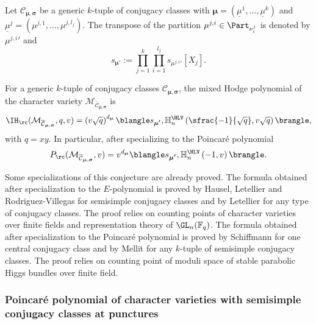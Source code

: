 Let $\mathcal{C}_{\boldsymbol{\mu},\boldsymbol{\sigma}}$ be a generic $k$-tuple of conjugacy classes with $\boldsymbol{\mu}=(\underline{\mu}^1,\dots,\underline{\mu}^k)$ and $\underline{\mu}^j=\left(\mu^{j,1},\dots,\mu^{j,l_j}\right)$. The transpose of the partition $\mu^{j,i}\in \Part_{\nu^j_i}$ is denoted by ${\mu^{j,i}}'$ and
\begin{equation}\label{eq_s_boldmu}
s_{\boldsymbol{\mu'}}:=\prod_{j=1}^k \prod_{i=1}^{l_j} s_{ {\mu^{j,i}}' }[X_j].
\end{equation}
\begin{conjecture}\label{conjecture_ic_char}
For a generic $k$-tuple of conjugacy classes $\mathcal{C}_{\boldsymbol{\mu},\boldsymbol{\sigma}}$, the mixed Hodge polynomial of the character variety $\mathcal{M}_{\overline{\mathcal{C}}_{\boldsymbol{\mu},\boldsymbol{\sigma}}}$ is
\[
\IH_\rc (\mathcal{M}_{\overline{\mathcal{C}}_{\boldsymbol{\mu},\boldsymbol{\sigma}}}, q, v) = \left(v \sqrt{q}\right)^{d_{\boldsymbol{\mu}}} \blangle s_{\boldsymbol{\mu'}}, \mathbb{H}_n^{\HLV}\left(\sfrac{-1}{\sqrt{q}},v\sqrt{q}\right)\brangle,
\]
with $q=x y$. In particular, after specializing to the Poincaré polynomial
\begin{equation}\label{eq_poincare_poly}
P_{\rc} (\mathcal{M}_{\overline{\mathcal{C}}_{\boldsymbol{\mu},\boldsymbol{\sigma}}}, v) = v^{d_{\boldsymbol{\mu}}}\blangle s_{\boldsymbol{\mu'}}, \mathbb{H}_n^{\HLV}\left(-1,v\right)\brangle.
\end{equation}
\end{conjecture}

Some specializations of this conjecture are already proved. The formula obtained after specialization to the $E$-polynomial is proved by Hausel, Letellier and Rodriguez-Villegas \cite{Hausel_Letellier_Villegas} for semisimple conjugacy classes and by Letellier \cite{Letellier13} for any type of conjugacy classes.
The proof relies on counting points of character varieties over finite fields and representation theory of $\GL_n(\mathbb{F}_q)$.
The formula obtained after specialization to the Poincaré polynomial is proved by Schiffmann \cite{Schiffmann16} for one central conjugacy class and by Mellit \cite{Mellit2020} for any $k$-tuple of semisimple conjugacy classes.
The proof relies on counting point of moduli space of stable parabolic Higgs bundles over finite field.

\subsubsection{Poincaré polynomial of character varieties with semisimple conjugacy classes at punctures}\label{subsect_poincare_ss}

